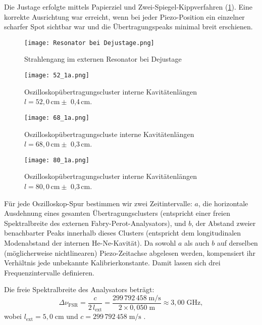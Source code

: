 Die Justage erfolgte mittels Papierziel und Zwei-Spiegel-Kippverfahren (\cref{fig:Resonator}). 
Eine korrekte Ausrichtung war erreicht, wenn bei jeder Piezo-Position ein einzelner scharfer Spot sichtbar war und die Übertragungspeaks minimal breit erschienen.
\begin{figure}[htbp]
  \centering
  \texttt{[image: Resonator bei Dejustage.png]}
  \caption{Strahlengang im externen Resonator bei Dejustage \cite{praktikum}}
  \label{fig:Resonator}
\end{figure}
\begin{figure}[htbp]
    \centering
    \texttt{[image: 52\_1a.png]}
     \caption{Oszilloskopübertragungscluster interne Kavitätenlängen $l = 52,0\,\si{\centi\meter} \pm$ 0{,}4\,\si{\centi\meter}.}
    \label{fig:9a}
\end{figure}
  \begin{figure}[htbp]
    \centering
    \texttt{[image: 68\_1a.png]}
     \caption{Oszilloskopübertragungscluste interne Kavitätenlängen $l = 68,0\,\si{\centi\meter} \pm$ 0{,}3\,\si{\centi\meter}.}
    \label{fig:9b}
  \end{figure}
  \newpage
  \begin{figure}[htbp]
    \centering
    \texttt{[image: 80\_1a.png]}
     \caption{Oszilloskopübertragungscluster interne Kavitätenlängen $l = 80,0\,\si{\centi\meter} \pm$ 0{,}3\,\si{\centi\meter}.}
    \label{fig:9c}
  \end{figure}
 
 Für jede Oszilloskop-Spur bestimmen wir zwei Zeitintervalle: $a$, die horizontale Ausdehnung eines gesamten Übertragungsclusters (entspricht einer freien Spektralbreite des externen Fabry-Perot-Analysators), und $b$, der Abstand zweier benachbarter Peaks innerhalb dieses Clusters (entspricht dem longitudinalen Modenabstand der internen He-Ne-Kavität). 
 Da sowohl $a$ als auch $b$ auf derselben (möglicherweise nichtlinearen) Piezo-Zeitachse abgelesen werden, kompensiert ihr Verhältnis jede unbekannte Kalibrierkonstante. Damit lassen sich drei Frequenzintervalle definieren.

 Die freie Spektralbreite des Analysators beträgt:
\begin{equation}
  \Delta\nu_{\mathrm{FSR}}
  = \frac{c}{2\,l_{\mathrm{ext}}}
  = \frac{299\,792\,458\;\mathrm{m/s}}{2 \times 0{,}050\;\mathrm{m}}
  \approx 3{,}00\;\mathrm{GHz},
\end{equation}
wobei $l_{\mathrm{ext}} = 5{,}0\;\mathrm{cm}$ und  $c = 299\,792\,458\;\mathrm{m/s}$ \cite{codata}.

